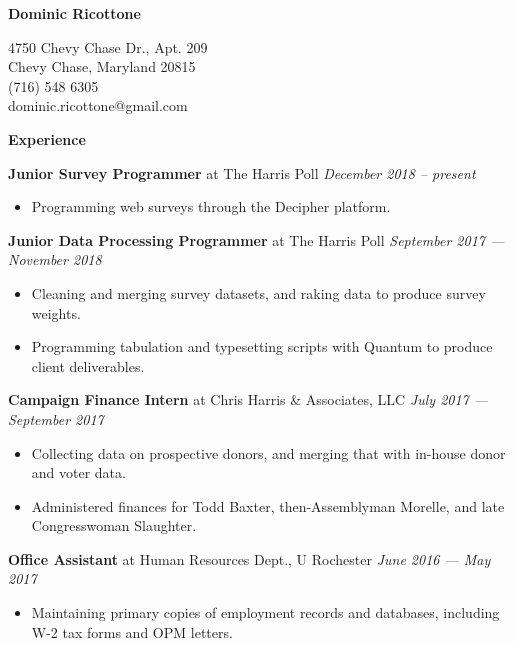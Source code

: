\documentclass[12pt]{article}
\newenvironment{details}{
\begin{itemize}[label={}]
	\small \setlength{\itemsep}{0pt}
}{\end{itemize}}
\begin{document}
\centering \Huge
\textbf{Dominic Ricottone}

\footnotesize
\begin{multicols}{2}
4750 Chevy Chase Dr., Apt. 209 \\
Chevy Chase, Maryland 20815 \\
(716) 548 6305 \\
dominic.ricottone@gmail.com
\end{multicols}

\large
\textbf{Experience} \hrulefill

\normalsize
\textbf{Junior Survey Programmer} at The Harris Poll \hfill \textit{December 2018 -- present}
\begin{details}
 	\item Programming web surveys through the Decipher platform.
\end{details}

\normalsize
\textbf{Junior Data Processing Programmer} at The Harris Poll \hfill \textit{September 2017 --- November 2018}
\begin{details}
 	\item Cleaning and merging survey datasets, and raking data to produce survey weights.
	\item Programming tabulation and typesetting scripts with Quantum to produce client deliverables.
\end{details}

\normalsize
\textbf{Campaign Finance Intern} at Chris Harris \& Associates, LLC \hfill \textit{July 2017 --- September 2017}
\begin{details}
	\item Collecting data on prospective donors, and merging that with in-house donor and voter data.
	\item Administered finances for Todd Baxter, then-Assemblyman Morelle, and late Congresswoman Slaughter.
\end{details}

\normalsize
\textbf{Office Assistant} at Human Resources Dept., U Rochester  \hfill \textit{June 2016 --- May 2017}
\begin{details}
	\item Maintaining primary copies of employment records and databases, including W-2 tax forms and OPM letters.
\end{details}

\end{document}
